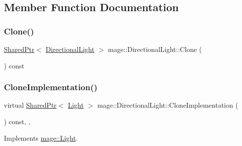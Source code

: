 \subsection{Member Function Documentation}
\hypertarget{classmage_1_1_directional_light_af68699d987bbb1170f76cdfe8bdf8c1d}{}\label{classmage_1_1_directional_light_af68699d987bbb1170f76cdfe8bdf8c1d} 
\subsubsection{\texorpdfstring{Clone()}{Clone()}}
{\footnotesize\ttfamily \hyperlink{namespacemage_a1e01ae66713838a7a67d30e44c67703e}{Shared\+Ptr}$<$ \hyperlink{classmage_1_1_directional_light}{Directional\+Light} $>$ mage\+::\+Directional\+Light\+::\+Clone (\begin{DoxyParamCaption}{ }\end{DoxyParamCaption}) const}

\hypertarget{classmage_1_1_directional_light_a4745c6c9424a427d5d1efaf8530cbb63}{}\label{classmage_1_1_directional_light_a4745c6c9424a427d5d1efaf8530cbb63} 
\subsubsection{\texorpdfstring{Clone\+Implementation()}{CloneImplementation()}}
{\footnotesize\ttfamily virtual \hyperlink{namespacemage_a1e01ae66713838a7a67d30e44c67703e}{Shared\+Ptr}$<$ \hyperlink{classmage_1_1_light}{Light} $>$ mage\+::\+Directional\+Light\+::\+Clone\+Implementation (\begin{DoxyParamCaption}{ }\end{DoxyParamCaption}) const\hspace{0.3cm}{\ttfamily [override]}, {\ttfamily [private]}, {\ttfamily [virtual]}}



Implements \hyperlink{classmage_1_1_light_a53ef28bad86a1a307db90cb265db4798}{mage\+::\+Light}.

\hypertarget{classmage_1_1_directional_light_a36df91928dfdb33d3e333d8c51332462}{}\label{classmage_1_1_directional_light_a36df91928dfdb33d3e333d8c51332462} 
